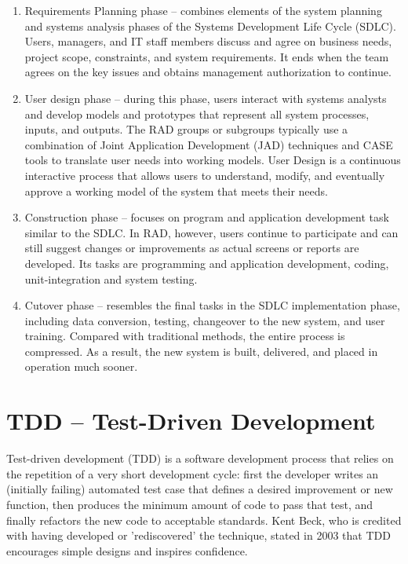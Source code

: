 \begin{enumerate}
\item Requirements Planning phase – combines elements of the system planning and systems analysis phases of the Systems Development Life Cycle (SDLC). Users, managers, and IT staff members discuss and agree on business needs, project scope, constraints, and system requirements. It ends when the team agrees on the key issues and obtains management authorization to continue.

\item User design phase – during this phase, users interact with systems analysts and develop models and prototypes that represent all system processes, inputs, and outputs. The RAD groups or subgroups typically use a combination of Joint Application Development (JAD) techniques and CASE tools to translate user needs into working models. User Design is a continuous interactive process that allows users to understand, modify, and eventually approve a working model of the system that meets their needs.

\item Construction phase – focuses on program and application development task similar to the SDLC. In RAD, however, users continue to participate and can still suggest changes or improvements as actual screens or reports are developed. Its tasks are programming and application development, coding, unit-integration and system testing.

\item Cutover phase – resembles the final tasks in the SDLC implementation phase, including data conversion, testing, changeover to the new system, and user training. Compared with traditional methods, the entire process is compressed. As a result, the new system is built, delivered, and placed in operation much sooner.
\end{enumerate}


\section{TDD -- Test-Driven Development}

Test-driven development (TDD) is a software development process that relies on the repetition of a very short development cycle: first the developer writes an (initially failing) automated test case that defines a desired improvement or new function, then produces the minimum amount of code to pass that test, and finally refactors the new code to acceptable standards. Kent Beck, who is credited with having developed or 'rediscovered' the technique, stated in 2003 that TDD encourages simple designs and inspires confidence.

